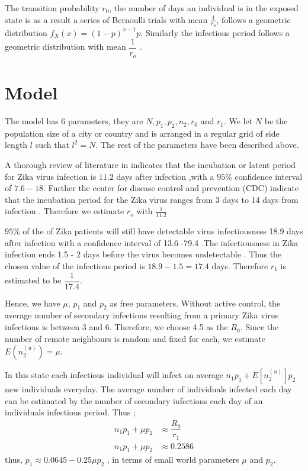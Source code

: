 The transition probability $r_0$, the number of days an individual is in the exposed state is as a result a series of Bernoulli trials with mean $\frac{1}{r_0}$, follows a geometric distribution $f_X (x) = (1-p) ^ {x-1} p$. Similarly the infectious period follows a geometric distribution with mean $\dfrac{1}{r_o}$ \citep{fu2013propagation}.

\section{Model}
The model has 6 parameters, they are $N, p_1, p_2, n_2, r_0$ and $r_1$. We let $N$ be the population size of a city or country and is arranged in a regular grid of side length $l $ such that $l^2 = N$. The rest of the parameters have been described above.

A thorough review of literature in \cite{lessler2016times} indicates that the incubation or latent period for Zika virus infection is $11.2$ days after infection ,with a $95 \%$ confidence interval of $7.6 -18$. Further the center for disease control and prevention (CDC) indicate that the incubation period for the Zika virus ranges from 3 days to 14 days from infection \citep{krow2017estimated}. Therefore we estimate $r_o$ with $\frac{1}{11.2}$

  $95\%$ of the of Zika patients will still have detectable virus infectiousness 18.9 days after infection with a confidence interval of 13.6 -79.4 \citep{lessler2016times}.The infectiousness in Zika infection ends 1.5 - 2 days before the virus becomes undetectable \citep{funk2016comparative}. Thus the chosen value of the infectious period is $18.9 - 1.5 = 17.4$ days. Therefore $r_1$ is estimated to be $\dfrac{1}{17.4}$.

Hence, we have $\mu$, $p_1$ and $p_2$  as free parameters. Without active control, the average number of secondary infections resulting from a primary  Zika  virus infectious is between 3 and 6. Therefore, we choose 4.5 as the $R_0$. Since the number of remote neighbours is random and fixed for each, we estimate $E (n^ {(u)} _2) = \mu$.

In this state each infectious individual will infect on average $n_1p_1 + E[n^{(u)}_2]p_2 $ new individuals everyday. The average number  of individuals infected each day can be estimated by the number of secondary infections each day of an individuals infectious period. Thus ;
\begin{align}
n_1 p_1 + \mu p_2 &\approx \dfrac{R_0}{r_1} 
\\ n_1 p_1 + \mu p_2 &\approx 0.2586 \label{eqn 5.32}
\end{align}
thus, 
$p_1 \approx   0.0645- 0.25 \mu p_2$ , in terms of small world parameters $\mu$ and $p_2$.

